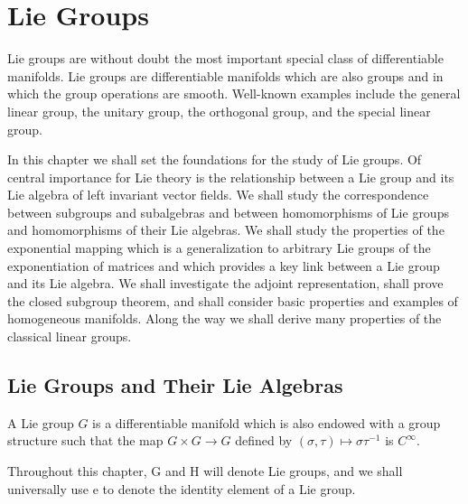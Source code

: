 \chapter{Lie Groups}

Lie groups are without doubt the most important special class of differentiable manifolds. Lie groups are differentiable manifolds which are also groups and in which the group operations are smooth. Well-known examples include the general linear group, the unitary group, the orthogonal group, and the special linear group.

In this chapter we shall set the foundations for the study of Lie groups. Of central importance for Lie theory is the relationship between a Lie group and its Lie algebra of left invariant vector fields. We shall study the correspondence between subgroups and subalgebras and between homomorphisms of Lie groups and homomorphisms of their Lie algebras. We shall study the properties of the exponential mapping which is a generalization to arbitrary Lie groups of the exponentiation of matrices and which provides a key link between a Lie group and its Lie algebra. We shall investigate the adjoint representation, shall prove the closed subgroup theorem, and shall consider basic properties and examples of homogeneous manifolds. Along the way we shall derive many properties of the classical linear groups.

\section{Lie Groups and Their Lie Algebras}

\begin{definition}\label{thm:3.1}
A Lie group $G$ is a differentiable manifold which is also endowed with a group structure such that the map $G \times G \to G$ defined by $(\sigma, \tau) \mapsto \sigma\tau^{-1}$ is $C^\infty$.

Throughout this chapter, G and H will denote Lie groups, and we shall universally use e to denote the identity element of a Lie group.

\end{definition}

